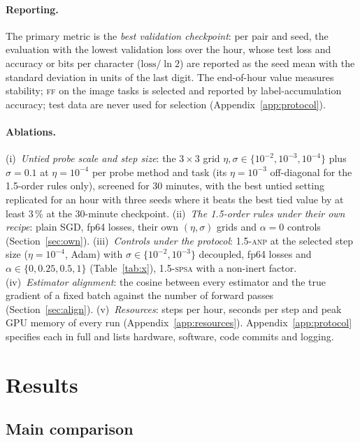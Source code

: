 \documentclass{article}
\newcommand{\method}[1]{\textsc{#1}}
\newcommand{\SPSAb}{\method{1.5-spsa}}
\newcommand{\ANPb}{\method{1.5-anp}}
\newcommand{\FF}{\method{ff}}
\begin{document}
\paragraph{Reporting.}
The primary metric is the \emph{best validation checkpoint}: per pair and seed, the
evaluation with the lowest validation loss over the hour, whose test loss and accuracy or bits per character ($\text{loss}/\ln 2$) are
reported as the seed mean with the standard deviation in units of the last digit. The end-of-hour value measures stability; \FF{} on the image tasks is selected and
reported by label-accumulation accuracy; test data are never used for selection
(Appendix~\ref{app:protocol}).

\paragraph{Ablations.}
(i)~\emph{Untied probe scale and step size}: the $3\times3$ grid
$\eta,\sigma\in\{10^{-2},10^{-3},10^{-4}\}$ plus $\sigma=0.1$ at $\eta=10^{-4}$ per
probe method and task (its $\eta=10^{-3}$ off-diagonal for the 1.5-order rules only), screened for 30 minutes, with the best untied setting
replicated for an hour with three seeds where it beats the best tied value by at least
3\,\% at the 30-minute checkpoint. (ii)~\emph{The 1.5-order rules under their own recipe}:
plain SGD, fp64 losses, their own $(\eta,\sigma)$ grids and $\alpha=0$ controls
(Section~\ref{sec:own}). (iii)~\emph{Controls under the protocol}:
\ANPb{} at the selected step size ($\eta=10^{-4}$, Adam) with $\sigma\in\{10^{-2},10^{-3}\}$
decoupled, fp64 losses and $\alpha\in\{0,0.25,0.5,1\}$ (Table~\ref{tab:x}), \SPSAb{}
with a non-inert factor.
(iv)~\emph{Estimator alignment}: the cosine between every estimator and the true
gradient of a fixed batch against the number of forward passes
(Section~\ref{sec:align}). (v)~\emph{Resources}: steps per hour, seconds per step and peak GPU memory of every
run (Appendix~\ref{app:resources}). Appendix~\ref{app:protocol} specifies each in full and lists
hardware, software, code commits and logging.

\section{Results}
\label{sec:results}

\subsection{Main comparison}
\label{sec:main}
\end{document}
